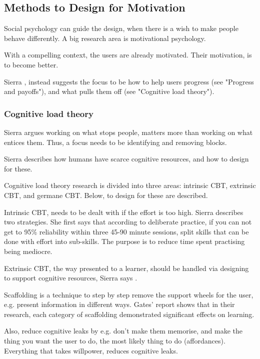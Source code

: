 \subsection{Methods to Design for Motivation}

Social psychology can guide the design, when there is a wish to make people behave differently. A big research area is motivational psychology.

With a compelling context, the users are already motivated. Their motivation, is to become better.

Sierra \cite{sierra}, instead suggests the focus to be how to help users progress (see "Progress and payoffs"), and what pulls them off (see "Cognitive load theory").

\subsubsection{Cognitive load theory}

Sierra argues working on what stops people, matters more than working on what entices them. Thus, a focus needs to be identifying and removing blocks.

Sierra \cite{sierra} describes how humans have scarce cognitive resources, and how to design for these.

Cognitive load theory research is divided into three areas: intrinsic CBT, extrinsic CBT, and germane CBT. Below, to design for these are described.

Intrinsic CBT, needs to be dealt with if the effort is too high. Sierra \cite{sierra}describes two strategies. She first says that according to deliberate practice, if you can not get to 95\% reliability within three 45-90 minute sessions, split skills that can be done with effort into sub-skills. The purpose is to reduce time spent practising being mediocre.

Extrinsic CBT, the way presented to a learner, should be handled via designing to support cognitive resources, Sierra says \cite{sierra}.

Scaffolding is a technique to step by step remove the support wheels for the user, e.g. present information in different ways. Gates' \cite{gates} report shows that in their research, each category of scaffolding demonstrated significant effects on learning.

Also, reduce cognitive leaks by e.g. don't make them memorise, and make the thing you want the user to do, the most likely thing to do (affordances). Everything that takes willpower, reduces cognitive leaks.

